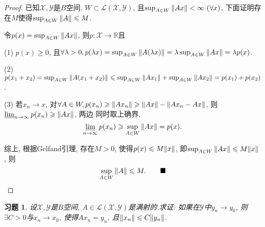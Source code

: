 \documentclass[a4paper,oneside,12pt]{ctexart}
\theoremstyle{plain}
\newtheorem{exercise}{习题}
\theoremstyle{nonumberplain}
\theoremstyle{nonumberplain}
\newtheorem{proof}{证明}
\newcommand{\R}{\mathbb{R}}
\newcommand{\sX}{\mathscr{X}}
\newcommand{\sY}{\mathscr{Y}}
\renewcommand{\liminf}{\varliminf}
\newcommand{\sL}{\mathscr{L}}
\begin{document}
    \begin{proof}
        已知$\sX,\sY$是$B$空间, $W\subset \sL(\sX,\sY)$, 且$\sup_{A\in W}\norm{Ax}<\infty\ (\forall x)$, 下面证明存在$M$使得$\sup_{A\in W}\norm{A}\leqslant M$.

        令$p(x)=\sup_{A\in W}\norm{Ax}$, 则$p:\sX\to\R$且 

        (1) $p(x)\geqslant 0$, 且$\forall \lambda>0,p(\lambda x)=\sup_{A\in W}\norm{A(\lambda x)}=\lambda\sup_{A\in W}\norm{Ax}=\lambda p(x)$.

        (2) $p(x_1+x_2)=\sup_{A\in W}\norm{A(x_1+x_2)}\leqslant \sup_{A\in W}\norm{Ax_1}+\sup_{A\in W}\norm{Ax_2}=p(x_1)+p(x_2)$.

        (3) 若$x_n\to x$, 对$\forall A\in W,p(x_n)\geqslant \norm{Ax_n}\geqslant \norm{Ax}-\norm{Ax_n-Ax}$, 则$\liminf_{n\to\infty}p(x_n)\\\geqslant \norm{Ax}$, 两边
        同时取上确界, 
        \begin{equation*}
            \liminf_{n\to\infty}p(x_n)\geqslant \sup_{A\in W}\norm{Ax}=p(x).
        \end{equation*}

        综上, 根据Gelfand引理, 存在$M>0$, 使得$p(x)\leqslant M\norm{x}$, 即$\sup_{A\in W}\norm{Ax}\leqslant M\norm{x}$, 则 
        \begin{equation*}
            \sup_{A\in W}\norm{A}\leqslant M.\qquad \blacksquare
        \end{equation*}
    \end{proof}

    \begin{exercise}
        \label{ex:2.3.11}
        设$\sX,\sY$是$B$空间, $A\in\sL(\sX,\sY)$是满射的.求证: 如果在$\sY$中$y_n\to y_0$, 则$\exists C>0$与$x_n\to x_0$, 使得$Ax_n=y_n$, 
        且$\norm{x_n}\leqslant C\norm{y_n}$.
    \end{exercise}
\end{document}
